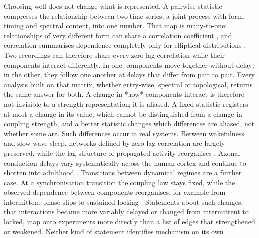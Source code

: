 \documentclass[pdflatex,sn-nature,iicol]{sn-jnl}
\begin{document}
Choosing well does not change what is represented. A pairwise statistic compresses the relationship between two time series, a joint process with form, timing and spectral content, into one number. That map is many-to-one: relationships of very different form can share a correlation coefficient \cite{anscombe1973graphs}, and correlation summarises dependence completely only for elliptical distributions \cite{embrechts2002correlation}. Two recordings can therefore share every zero-lag correlation while their components interact differently. In one, components move together without delay; in the other, they follow one another at delays that differ from pair to pair. Every analysis built on that matrix, whether entry-wise, spectral or topological, returns the same answer for both. A change in *how* components interact is therefore not invisible to a strength representation; it is aliased. A fixed statistic registers at most a change in its value, which cannot be distinguished from a change in coupling strength, and a better statistic changes which differences are aliased, not whether some are. Such differences occur in real systems. Between wakefulness and slow-wave sleep, networks defined by zero-lag correlation are largely preserved, while the lag structure of propagated activity reorganises \cite{mitra2015propagated}. Axonal conduction delays vary systematically across the human cortex \cite{lemarechal2022atlas} and continue to shorten into adulthood \cite{vanblooijs2023developmental}. Transitions between dynamical regimes are a further case. At a synchronisation transition the coupling law stays fixed, while the observed dependence between components reorganises, for example from intermittent phase slips to sustained locking \cite{arenas2008synchronization}. Statements about such changes, that interactions became more variably delayed or changed from intermittent to locked, map onto experiments more directly than a list of edges that strengthened or weakened. Neither kind of statement identifies mechanism on its own \cite{mehler2018lure,reid2019advancing}.
\end{document}
